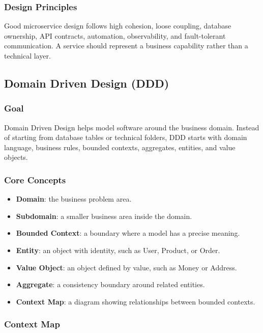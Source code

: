 \documentclass[12pt,a4paper]{article}
\begin{document}
\subsubsection{Design Principles}

Good microservice design follows high cohesion, loose coupling, database ownership, API contracts, automation, observability, and fault-tolerant communication. A service should represent a business capability rather than a technical layer.

\subsection{Domain Driven Design (DDD)}

\subsubsection{Goal}

Domain Driven Design helps model software around the business domain. Instead of starting from database tables or technical folders, DDD starts with domain language, business rules, bounded contexts, aggregates, entities, and value objects.

\subsubsection{Core Concepts}

\begin{itemize}
    \item \textbf{Domain}: the business problem area.
    \item \textbf{Subdomain}: a smaller business area inside the domain.
    \item \textbf{Bounded Context}: a boundary where a model has a precise meaning.
    \item \textbf{Entity}: an object with identity, such as User, Product, or Order.
    \item \textbf{Value Object}: an object defined by value, such as Money or Address.
    \item \textbf{Aggregate}: a consistency boundary around related entities.
    \item \textbf{Context Map}: a diagram showing relationships between bounded contexts.
\end{itemize}

\subsubsection{Context Map}
\end{document}
